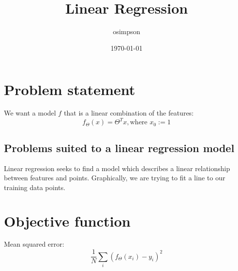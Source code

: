 \documentclass[12pt]{article}
\title{Linear Regression}
\author{osimpson}
\date{\today}
\begin{document}
\maketitle

\section{Problem statement}

We want a model $f$ that is a linear combination of the features:
\begin{equation}
    f_{\Theta}(x) = \Theta^T x, \text{where } x_0 := 1
\end{equation}

\subsection{Problems suited to a linear regression model}

Linear regression seeks to find a model which describes a linear relationship
between features and points.  Graphically, we are trying to fit a line to our
training data points.

\section{Objective function}

Mean squared error:
\begin{equation}
    \frac{1}{N}\sum_{i} (f_{\Theta}(x_i) - y_i)^2
\end{equation}
\end{document}
